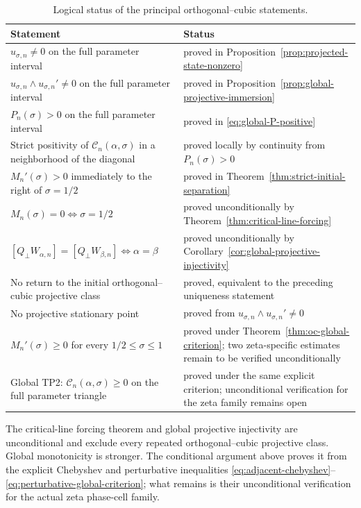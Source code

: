 \documentclass[11pt]{amsart}
\numberwithin{equation}{section}
\begin{document}
\begin{table}[htbp]
\centering
\caption{Logical status of the principal orthogonal--cubic statements.}
\label{tab:oc-status}
\begin{tabular}{p{}p{}}
\toprule
Statement & Status\\
\midrule
$u_{\sigma,n}\neq0$ on the full parameter interval & proved in Proposition~\ref{prop:projected-state-nonzero}\\
$u_{\sigma,n}\wedge u_{\sigma,n}'\neq0$ on the full parameter interval & proved in Proposition~\ref{prop:global-projective-immersion}\\
$P_n(\sigma)>0$ on the full parameter interval & proved in \eqref{eq:global-P-positive}\\
Strict positivity of $\mathcal C_n(\alpha,\sigma)$ in a neighborhood of the diagonal & proved locally by continuity from $P_n(\sigma)>0$\\
$M_n'(\sigma)>0$ immediately to the right of $\sigma=1/2$ & proved in Theorem~\ref{thm:strict-initial-separation}\\
$M_n(\sigma)=0\iff \sigma=1/2$ & proved unconditionally by Theorem~\ref{thm:critical-line-forcing}\\
$[Q_\perp W_{\alpha,n}]=[Q_\perp W_{\beta,n}]\iff\alpha=\beta$ & proved unconditionally by Corollary~\ref{cor:global-projective-injectivity}\\
No return to the initial orthogonal--cubic projective class & proved, equivalent to the preceding uniqueness statement\\
No projective stationary point & proved from $u_{\sigma,n}\wedge u_{\sigma,n}'\neq0$\\
$M_n'(\sigma)\ge0$ for every $1/2\le\sigma\le1$ & proved under Theorem~\ref{thm:oc-global-criterion}; two zeta-specific estimates remain to be verified unconditionally\\
Global TP2: $\mathcal C_n(\alpha,\sigma)\ge0$ on the full parameter triangle & proved under the same explicit criterion; unconditional verification for the zeta family remains open\\
\bottomrule
\end{tabular}
\end{table}

The critical-line forcing theorem and global projective injectivity are
unconditional and exclude every repeated orthogonal--cubic projective class. Global
monotonicity is stronger. The conditional argument above proves it from the
explicit Chebyshev and perturbative inequalities
\eqref{eq:adjacent-chebyshev}--\eqref{eq:perturbative-global-criterion}; what
remains is their unconditional verification for the actual zeta phase-cell family.
\end{document}
